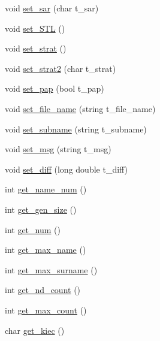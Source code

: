 \begin{DoxyCompactItemize}
void \mbox{\hyperlink{class_important___values_aa5c9258486a4c9a5cb001705b930f063}{set\+\_\+sar}} (char t\+\_\+sar)
\item 
void \mbox{\hyperlink{class_important___values_af46179f6b6693ff2e1df7810278f6cbc}{set\+\_\+\+S\+TL}} ()
\item 
void \mbox{\hyperlink{class_important___values_ac2a5895eab687e6852c5569e03e2c0d0}{set\+\_\+strat}} ()
\item 
void \mbox{\hyperlink{class_important___values_ac2792a8a882a06c8ff7d48e4da56c9d2}{set\+\_\+strat2}} (char t\+\_\+strat)
\item 
void \mbox{\hyperlink{class_important___values_a54afaefb62f9b363438d917d92fc8fab}{set\+\_\+pap}} (bool t\+\_\+pap)
\item 
void \mbox{\hyperlink{class_important___values_a342e5dd488c2082dcdad69e68b9c5043}{set\+\_\+file\+\_\+name}} (string t\+\_\+file\+\_\+name)
\item 
void \mbox{\hyperlink{class_important___values_abb848847b7923651d8ea13d7f6938ede}{set\+\_\+subname}} (string t\+\_\+subname)
\item 
void \mbox{\hyperlink{class_important___values_a64c57bb070fec00295a453a54e18fb40}{set\+\_\+msg}} (string t\+\_\+msg)
\item 
void \mbox{\hyperlink{class_important___values_ab2cbeb82a9612d95ee2e911c4ddde6e8}{set\+\_\+diff}} (long double t\+\_\+diff)
\item 
int \mbox{\hyperlink{class_important___values_aafd74fdbadfb3d603eb4704df290df9d}{get\+\_\+name\+\_\+num}} ()
\item 
int \mbox{\hyperlink{class_important___values_aad47270a6a55deffdfb54621f7afead3}{get\+\_\+gen\+\_\+size}} ()
\item 
int \mbox{\hyperlink{class_important___values_a0979b7093620c12cf65f1b7d8027060d}{get\+\_\+num}} ()
\item 
int \mbox{\hyperlink{class_important___values_aabf8da45218a436741da31d0efb2f081}{get\+\_\+max\+\_\+name}} ()
\item 
int \mbox{\hyperlink{class_important___values_a9c159ef58aa600bf7adf23f079792285}{get\+\_\+max\+\_\+surname}} ()
\item 
int \mbox{\hyperlink{class_important___values_a3b18d0fc91d626e5497a24eb4264cdc3}{get\+\_\+nd\+\_\+count}} ()
\item 
int \mbox{\hyperlink{class_important___values_a6971c4d26c6793fbc97302c88fa49862}{get\+\_\+max\+\_\+count}} ()
\item 
char \mbox{\hyperlink{class_important___values_a484f0bb9caa78d044f3f491629045649}{get\+\_\+kiec}} ()

\end{DoxyCompactItemize}
